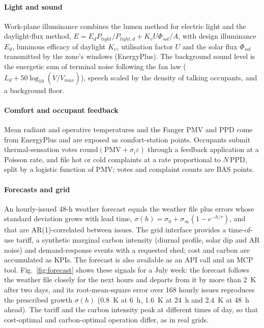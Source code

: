 \documentclass[preprint,12pt,authoryear=false]{elsarticle}
\begin{document}
\paragraph{Light and sound} Work-plane illuminance combines the lumen method for electric light and the daylight-flux
method, $E = E_d P_{light}/P_{light,d} + K_v U \Phi_{sol}/A$, with design illuminance $E_d$, luminous efficacy of
daylight $K_v$, utilisation factor $U$ and the solar flux $\Phi_{sol}$ transmitted by the zone's windows (EnergyPlus).
The background sound level is the energetic sum of terminal noise following the fan law
($L_{d} + 50\log_{10}(\dot V/\dot V_{max})$), speech scaled by the density of talking occupants, and a background floor.

\paragraph{Comfort and occupant feedback} Mean radiant and operative temperatures and the Fanger PMV and PPD
\cite{iso7730} come from EnergyPlus and are exposed as comfort-station points. Occupants submit thermal-sensation
votes $\mathrm{round}(\mathrm{PMV} + \sigma_i\varepsilon)$ through a feedback application at a Poisson rate, and file
hot or cold complaints at a rate proportional to $N\,\mathrm{PPD}$, split by a logistic function of PMV; votes and
complaint counts are BAS points.

\paragraph{Forecasts and grid} An hourly-issued 48-h weather forecast equals the weather file plus errors whose standard
deviation grows with lead time, $\sigma(h)=\sigma_0+\sigma_\infty(1-e^{-h/\tau})$, and that are AR(1)-correlated
between issues. The grid interface provides a time-of-use tariff, a synthetic marginal carbon intensity (diurnal
profile, solar dip and AR noise) and demand-response events with a requested shed; cost and carbon are accumulated as
KPIs. The forecast is also available as an API call and an MCP tool. Fig.~\ref{fig:forecast} shows these signals for
a July week: the forecast follows the weather file closely for the next hours and departs from it by more than 2~K
after two days, and its root-mean-square error over 168 hourly issues reproduces the prescribed growth $\sigma(h)$
(0.8~K at 6~h, 1.6~K at 24~h and 2.4~K at 48~h ahead). The tariff and the carbon intensity peak at different times of
day, so that cost-optimal and carbon-optimal operation differ, as in real grids.
\end{document}
